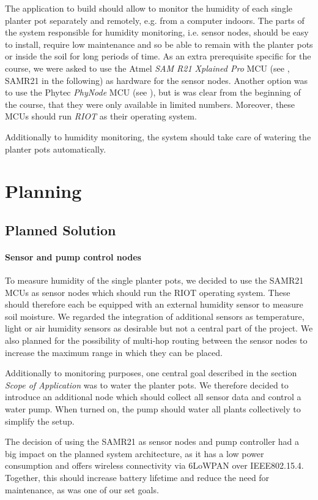 \documentclass[11pt,paper=a4,parskip=half]{scrartcl}
\begin{document}
  The application to build should allow to monitor the humidity of each single
  planter pot separately and remotely, e.g. from a computer indoors. The parts
  of the system responsible for humidity monitoring, i.e. sensor nodes, should
  be easy to install, require low maintenance and so be able to remain with the
  planter pots or inside the soil for long periods of time. As an extra
  prerequisite specific for the course, we were asked to use the Atmel
  \textit{SAM R21 Xplained Pro} MCU (see \cite{samr21}, SAMR21 in the
  following) as hardware for the sensor nodes. Another option was to use the
  Phytec \textit{PhyNode} MCU (see \cite{phywave}), but is was clear from the
  beginning of the course, that they were only available in limited numbers.
  Moreover, these MCUs should run \textit{RIOT} as their operating system.

  Additionally to humidity monitoring, the system should take care of watering
  the planter pots automatically.

\section{Planning}
\subsection{Planned Solution}
  \paragraph{Sensor and pump control nodes} To measure humidity of the single
  planter pots, we decided to use the SAMR21 MCUs as sensor nodes which should
  run the RIOT operating system. These should therefore each be equipped with
  an external humidity sensor to measure soil moisture. We regarded the
  integration of additional sensors as temperature, light or air humidity
  sensors as desirable but not a central part of the project. We also planned
  for the possibility of multi-hop routing between the sensor nodes to increase
  the maximum range in which they can be placed.

  Additionally to monitoring purposes, one central goal described in the
  section \textit{Scope of Application} was to water the planter pots. We
  therefore decided  to introduce an additional node which should collect all
  sensor data and control a water pump. When turned on, the pump should water
  all plants collectively to simplify the setup.

  The decision of using the SAMR21 as sensor nodes and pump controller had a
  big impact on the planned system architecture, as it has a low power
  consumption and offers wireless connectivity via 6LoWPAN over IEEE802.15.4.
  Together, this should increase battery lifetime and reduce the need for
  maintenance, as was one of our set goals.
\end{document}
